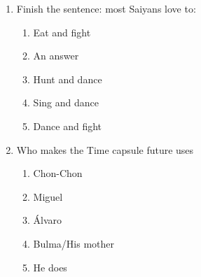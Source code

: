 \documentclass[letterpaper,addpoints,answers,twocolumn,10pt]{exam}
\begin{document}
\begin{enumerate}[leftmargin=.2in]
\begin{enumerate}[noitemsep,leftmargin=0in]
\end{enumerate}



\item  Finish the sentence: most Saiyans love to:


\begin{enumerate}[noitemsep,leftmargin=0in]


\item  Eat and fight
\item  An answer
\item  Hunt and dance
\item  Sing and dance
\item  Dance and fight


\end{enumerate}



\item  Who makes the Time capsule future uses


\begin{enumerate}[noitemsep,leftmargin=0in]


\item  Chon-Chon
\item  Miguel
\item  Álvaro
\item  Bulma/His mother
\item  He does


\end{enumerate}



\end{enumerate}
\end{document}

